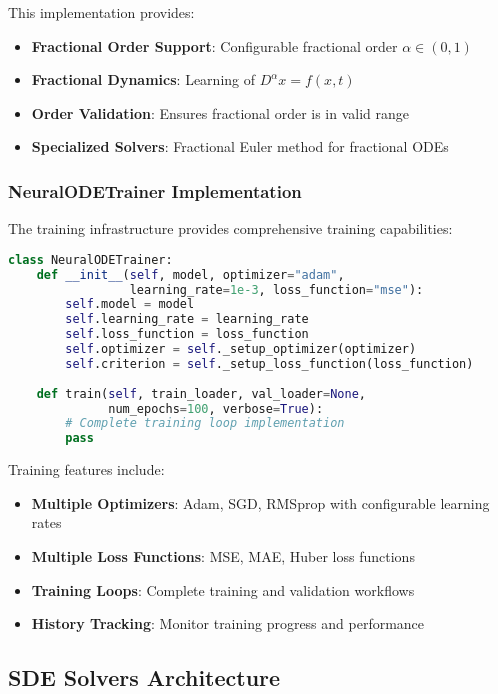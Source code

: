 This implementation provides:
\begin{itemize}
    \item \textbf{Fractional Order Support}: Configurable fractional order $\alpha \in (0,1)$
    \item \textbf{Fractional Dynamics}: Learning of $D^{\alpha} x = f(x, t)$
    \item \textbf{Order Validation}: Ensures fractional order is in valid range
    \item \textbf{Specialized Solvers}: Fractional Euler method for fractional ODEs
\end{itemize}

\subsubsection{NeuralODETrainer Implementation}

The training infrastructure provides comprehensive training capabilities:

\begin{lstlisting}[language=Python, caption=NeuralODETrainer Implementation]
class NeuralODETrainer:
    def __init__(self, model, optimizer="adam", 
                 learning_rate=1e-3, loss_function="mse"):
        self.model = model
        self.learning_rate = learning_rate
        self.loss_function = loss_function
        self.optimizer = self._setup_optimizer(optimizer)
        self.criterion = self._setup_loss_function(loss_function)
    
    def train(self, train_loader, val_loader=None, 
              num_epochs=100, verbose=True):
        # Complete training loop implementation
        pass
\end{lstlisting}

Training features include:
\begin{itemize}
    \item \textbf{Multiple Optimizers}: Adam, SGD, RMSprop with configurable learning rates
    \item \textbf{Multiple Loss Functions}: MSE, MAE, Huber loss functions
    \item \textbf{Training Loops}: Complete training and validation workflows
    \item \textbf{History Tracking}: Monitor training progress and performance
\end{itemize}

\subsection{SDE Solvers Architecture}

